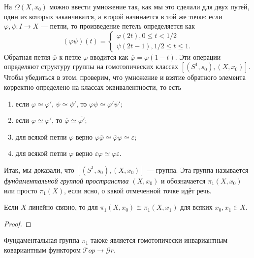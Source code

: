 На $\Omega(X,x_0)$ можно ввести умножение так, как мы это сделали для двух путей, один из которых заканчиватся, а второй начинается в той же точке: если $\varphi,\psi\colon I\to X$ --- петли, то произведение петель определяется как
	\begin{equation}
		(\varphi\psi)(t)=
		\begin{cases}
			\varphi(2t), 0\leqslant t<1/2\\
			\psi(2t-1), 1/2\leqslant t\leqslant 1.
		\end{cases}
	\end{equation}
Обратная петля $\overline{\varphi}$ к петле $\varphi$ вводится как $\overline{\varphi}=\varphi(1-t)$. Эти операции определяют структуру группы на гомотопических классах $[(S^1,s_0),(X,x_0)]$. Чтобы убедиться в этом, проверим, что умножение и взятие обратного элемента корректно определено на классах эквивалентности, то есть
	\begin{enumerate}
		\item если $\varphi\simeq\varphi'$, $\psi\simeq\psi'$, то $\varphi\psi\simeq\varphi'\psi'$;
		\item если $\varphi\simeq\varphi'$, то $\overline{\varphi}\simeq\overline{\varphi'}$;
		\item для всякой петли $\varphi$ верно $\varphi\overline{\varphi}\simeq\overline{\varphi}\varphi\simeq\varepsilon$;
		\item для всякой петли $\varphi$ верно $\varepsilon\varphi\simeq\varphi\varepsilon$.
	\end{enumerate}
Итак, мы доказали, что $[(S^1,s_0),(X,x_0)]$ --- группа. Эта группа называется \textit{фундаментальной группой пространства} $(X,x_0)$ и обозначается $\pi_1(X,x_0)$ или просто $\pi_1(X)$, если ясно, о какой отмеченной точке идёт речь.
\begin{prop}
	Если $X$ линейно связно, то для $\pi_1(X,x_0)\cong\pi_1(X,x_1)$ для всяких $x_0,x_1\in X$.
\end{prop}
\begin{proof}

\end{proof}
\begin{prop}
	Фундаментальная группа $\pi_1$ также является гомотопически инвариантным ковариантным функтором $\mathcal{T}op\to\mathcal{G}r$.
\end{prop}
